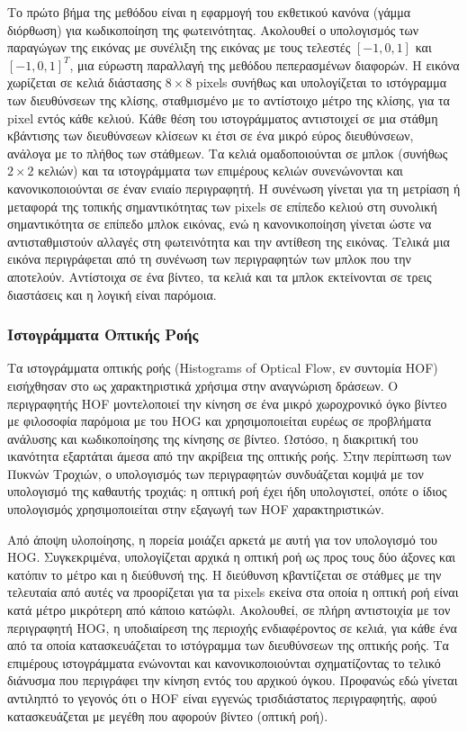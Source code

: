 \documentclass[11pt,a4paper,english,greek,twoside]{../Thesis}
\begin{document}
\par Το πρώτο βήμα της μεθόδου είναι η εφαρμογή του εκθετικού κανόνα (γάμμα διόρθωση) για κωδικοποίηση της φωτεινότητας. Ακολουθεί ο υπολογισμός των παραγώγων της εικόνας με συνέλιξη της εικόνας με τους τελεστές $[-1, 0, 1]$ και $[-1, 0, 1]^T$, μια εύρωστη παραλλαγή της μεθόδου πεπερασμένων διαφορών. Η εικόνα χωρίζεται σε κελιά διάστασης $8 \times 8$ pixels συνήθως και υπολογίζεται το ιστόγραμμα των διευθύνσεων της κλίσης, σταθμισμένο με το αντίστοιχο μέτρο της κλίσης, για τα pixel εντός κάθε κελιού. Κάθε θέση του ιστογράμματος αντιστοιχεί σε μια στάθμη κβάντισης των διευθύνσεων κλίσεων κι έτσι σε ένα μικρό εύρος διευθύνσεων, ανάλογα με το πλήθος των στάθμεων. Τα κελιά ομαδοποιούνται σε μπλοκ (συνήθως $2 \times 2$ κελιών) και τα ιστογράμματα των επιμέρους κελιών συνενώνονται και κανονικοποιούνται σε έναν ενιαίο περιγραφητή. Η συνένωση γίνεται για τη μετρίαση ή μεταφορά της τοπικής σημαντικότητας των pixels σε επίπεδο κελιού στη συνολική σημαντικότητα σε επίπεδο μπλοκ εικόνας, ενώ η κανονικοποίηση γίνεται ώστε να αντισταθμιστούν αλλαγές στη φωτεινότητα και την αντίθεση της εικόνας. Τελικά μια εικόνα περιγράφεται από τη συνένωση των περιγραφητών των μπλοκ που την αποτελούν. Αντίστοιχα σε ένα βίντεο, τα κελιά και τα μπλοκ εκτείνονται σε τρεις διαστάσεις και η λογική είναι παρόμοια.

\subsubsection{Ιστογράμματα Οπτικής Ροής}
Τα ιστογράμματα οπτικής ροής (Histograms of Optical Flow, εν συντομία HΟF) εισήχθησαν στο \cite{laptev_2008} ως χαρακτηριστικά χρήσιμα στην αναγνώριση δράσεων. Ο περιγραφητής HΟF μοντελοποιεί την κίνηση σε ένα μικρό χωροχρονικό όγκο βίντεο με φιλοσοφία παρόμοια με του  HΟG και χρησιμοποιείται ευρέως σε προβλήματα ανάλυσης και κωδικοποίησης της κίνησης σε βίντεο. Ωστόσο, η διακριτική του ικανότητα εξαρτάται άμεσα από την ακρίβεια της οπτικής ροής. Στην περίπτωση των Πυκνών Τροχιών, ο υπολογισμός των περιγραφητών συνδυάζεται κομψά με τον υπολογισμό της καθαυτής τροχιάς: η οπτική ροή έχει ήδη υπολογιστεί, οπότε ο ίδιος υπολογισμός χρησιμοποιείται στην εξαγωγή των HOF χαρακτηριστικών.
\par Από άποψη υλοποίησης, η πορεία μοιάζει αρκετά με αυτή για τον υπολογισμό του HOG. Συγκεκριμένα, υπολογίζεται αρχικά η οπτική ροή ως προς τους δύο άξονες και κατόπιν το μέτρο και η διεύθυνσή της. Η διεύθυνση κβαντίζεται σε στάθμες με την τελευταία από αυτές να προορίζεται για τα pixels εκείνα στα οποία η οπτική ροή είναι κατά μέτρο μικρότερη από κάποιο κατώφλι. Ακολουθεί, σε πλήρη αντιστοιχία με τον περιγραφητή HOG, η υποδιαίρεση της περιοχής ενδιαφέροντος σε κελιά, για κάθε ένα από τα οποία κατασκευάζεται το ιστόγραμμα των διευθύνσεων της οπτικής ροής. Τα επιμέρους ιστογράμματα ενώνονται και κανονικοποιούνται σχηματίζοντας το τελικό διάνυσμα που περιγράφει την κίνηση εντός του αρχικού όγκου. Προφανώς εδώ γίνεται αντιληπτό το γεγονός ότι ο HOF είναι εγγενώς τρισδιάστατος περιγραφητής, αφού κατασκευάζεται με μεγέθη που αφορούν βίντεο (οπτική ροή).
\end{document}
